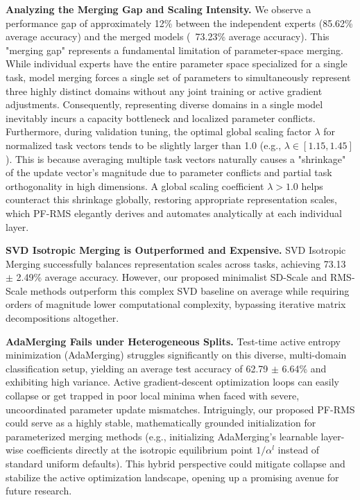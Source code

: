 \textbf{Analyzing the Merging Gap and Scaling Intensity.} We observe a performance gap of approximately 12\% between the independent experts (85.62\% average accuracy) and the merged models (~73.23\% average accuracy). This "merging gap" represents a fundamental limitation of parameter-space merging. While individual experts have the entire parameter space specialized for a single task, model merging forces a single set of parameters to simultaneously represent three highly distinct domains without any joint training or active gradient adjustments. Consequently, representing diverse domains in a single model inevitably incurs a capacity bottleneck and localized parameter conflicts. Furthermore, during validation tuning, the optimal global scaling factor $\lambda$ for normalized task vectors tends to be slightly larger than 1.0 (e.g., $\lambda \in [1.15, 1.45]$). This is because averaging multiple task vectors naturally causes a "shrinkage" of the update vector's magnitude due to parameter conflicts and partial task orthogonality in high dimensions. A global scaling coefficient $\lambda > 1.0$ helps counteract this shrinkage globally, restoring appropriate representation scales, which PF-RMS elegantly derives and automates analytically at each individual layer.

\textbf{SVD Isotropic Merging is Outperformed and Expensive.}
SVD Isotropic Merging successfully balances representation scales across tasks, achieving 73.13 $\pm$ 2.49\% average accuracy. However, our proposed minimalist SD-Scale and RMS-Scale methods outperform this complex SVD baseline on average while requiring orders of magnitude lower computational complexity, bypassing iterative matrix decompositions altogether.

\textbf{AdaMerging Fails under Heterogeneous Splits.}
Test-time active entropy minimization (AdaMerging) struggles significantly on this diverse, multi-domain classification setup, yielding an average test accuracy of 62.79 $\pm$ 6.64\% and exhibiting high variance. Active gradient-descent optimization loops can easily collapse or get trapped in poor local minima when faced with severe, uncoordinated parameter update mismatches. Intriguingly, our proposed PF-RMS could serve as a highly stable, mathematically grounded initialization for parameterized merging methods (e.g., initializing AdaMerging's learnable layer-wise coefficients directly at the isotropic equilibrium point $1/\alpha^l$ instead of standard uniform defaults). This hybrid perspective could mitigate collapse and stabilize the active optimization landscape, opening up a promising avenue for future research.

